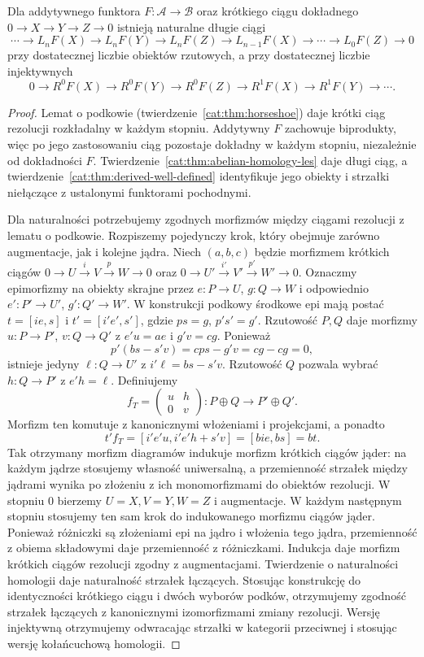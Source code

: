 \begin{twierdzenie}\label{cat:thm:derived-les}
Dla addytywnego funktora $F:\mathcal A\to\mathcal B$ oraz krótkiego ciągu dokładnego $0\to X\to Y\to Z\to0$ istnieją naturalne długie ciągi
\[
 \cdots\to L_nF(X)\to L_nF(Y)\to L_nF(Z)
 \to L_{n-1}F(X)\to\cdots\to L_0F(Z)\to0
\]
przy dostatecznej liczbie obiektów rzutowych, a przy dostatecznej liczbie injektywnych
\[
 0\to R^0F(X)\to R^0F(Y)\to R^0F(Z)
 \to R^1F(X)\to R^1F(Y)\to\cdots .
\]
\end{twierdzenie}
\begin{proof}
Lemat o podkowie (twierdzenie~\ref{cat:thm:horseshoe}) daje krótki ciąg rezolucji rozkładalny w każdym stopniu. Addytywny $F$ zachowuje biprodukty, więc po jego zastosowaniu ciąg pozostaje dokładny w każdym stopniu, niezależnie od dokładności $F$. Twierdzenie~\ref{cat:thm:abelian-homology-les} daje długi ciąg, a twierdzenie~\ref{cat:thm:derived-well-defined} identyfikuje jego obiekty i strzałki niełączące z ustalonymi funktorami pochodnymi.

Dla naturalności potrzebujemy zgodnych morfizmów między ciągami rezolucji z lematu o podkowie. Rozpiszemy pojedynczy krok, który obejmuje zarówno augmentacje, jak i kolejne jądra. Niech $(a,b,c)$ będzie morfizmem krótkich ciągów $0\to U\xrightarrow{i}V\xrightarrow{p}W\to0$ oraz $0\to U'\xrightarrow{i'}V'\xrightarrow{p'}W'\to0$. Oznaczmy epimorfizmy na obiekty skrajne przez $e:P\to U$, $g:Q\to W$ i odpowiednio $e':P'\to U'$, $g':Q'\to W'$. W konstrukcji podkowy środkowe epi mają postać $t=[ie,s]$ i $t'=[i'e',s']$, gdzie $ps=g$, $p's'=g'$. Rzutowość $P,Q$ daje morfizmy $u:P\to P'$, $v:Q\to Q'$ z $e'u=ae$ i $g'v=cg$. Ponieważ
\[
 p'(bs-s'v)=cps-g'v=cg-cg=0,
\]
istnieje jedyny $\ell:Q\to U'$ z $i'\ell=bs-s'v$. Rzutowość $Q$ pozwala wybrać $h:Q\to P'$ z $e'h=\ell$. Definiujemy
\[
 f_T=\begin{pmatrix}u&h\\0&v\end{pmatrix}
 :P\oplus Q\to P'\oplus Q'.
\]
Morfizm ten komutuje z kanonicznymi włożeniami i projekcjami, a ponadto
\[
 t'f_T=[i'e'u,i'e'h+s'v]=[bie,bs]=bt.
\]
Tak otrzymany morfizm diagramów indukuje morfizm krótkich ciągów jąder: na każdym jądrze stosujemy własność uniwersalną, a przemienność strzałek między jądrami wynika po złożeniu z ich monomorfizmami do obiektów rezolucji. W stopniu $0$ bierzemy $U=X,V=Y,W=Z$ i augmentacje. W każdym następnym stopniu stosujemy ten sam krok do indukowanego morfizmu ciągów jąder. Ponieważ różniczki są złożeniami epi na jądro i włożenia tego jądra, przemienność z obiema składowymi daje przemienność z różniczkami. Indukcja daje morfizm krótkich ciągów rezolucji zgodny z augmentacjami. Twierdzenie o naturalności homologii daje naturalność strzałek łączących. Stosując konstrukcję do identyczności krótkiego ciągu i dwóch wyborów podków, otrzymujemy zgodność strzałek łączących z kanonicznymi izomorfizmami zmiany rezolucji. Wersję injektywną otrzymujemy odwracając strzałki w kategorii przeciwnej i stosując wersję kołańcuchową homologii.
\end{proof}

